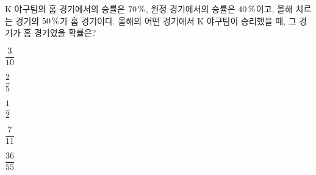 K 야구팀의 홈 경기에서의 승률은 $70\mkern3mu \%$, 원정 경기에서의 승률은 $40\mkern3mu \%$이고, 올해 치르는 경기의 $50\mkern3mu \%$가 홈 경기이다. 올해의 어떤 경기에서 K 야구팀이 승리했을 때, 그 경기가 홈 경기였을 확률은?
\begin{choices32}{\rule[-3ex]{0pt}{8ex}$\dfrac{3}{10}$}{\rule[-3ex]{0pt}{8ex}$\dfrac{2}{5}$}{\rule[-3ex]{0pt}{8ex}$\dfrac{1}{2}$}{\rule[-3ex]{0pt}{8ex}$\dfrac{7}{11}$}{\rule[-3ex]{0pt}{8ex}$\dfrac{36}{55}$}\end{choices32}
